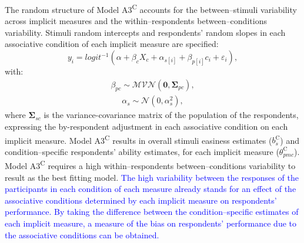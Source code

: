 \documentclass[12pt]{book}
\begin{document}

The random structure of Model A3\textsuperscript{C} accounts for the between--stimuli variability across implicit measures and the within--respondents between--conditions variability. Stimuli random intercepts and respondents' random slopes in each associative condition of each implicit measure are specified: 
%
\begin{equation}\label{eq:type2}
	y_{i} = logit^{-1}(\alpha + \beta_{c}X_{c} + \alpha_{s[i]} +  \beta_{p[i]}c_{i} + \varepsilon_{i}),
\end{equation}
with:
\begin{align}
	\beta_{pc} \sim \mathcal{MVN}(\bm{0}, \bm{\Sigma}_{pc}),
\end{align}
\begin{align}
	\alpha_s \sim \mathcal{N} (0, \alpha_s^2),
\end{align}
where $\bm{\Sigma}_{sc}$ is the variance-covariance matrix of the population of the respondents, expressing the by-respondent adjustment in each associative condition on each implicit measure.
Model A3\textsuperscript{C} results in overall stimuli easiness estimates ($b_{s}^\text{C}$) and condition--specific respondents' ability estimates, for each implicit measure ($\theta_{pmc}^\text{C}$). 
Model A3\textsuperscript{C} requires a high within--respondents between--conditions variability to result as the best fitting model.
\textcolor{blue}{The high variability between the responses of the participants in each condition of each measure already stands for an effect of the associative conditions determined by each implicit measure on respondents' performance. 
	By taking the difference between the condition--specific estimates of each implicit measure, a measure of the bias on respondents' performance due to the associative conditions can be obtained.} 
 
\end{document}
